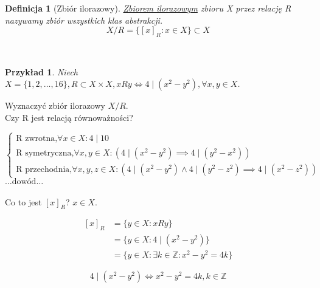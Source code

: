 \documentclass[a5paper,8pt]{article}
\theoremstyle{mythmstyle}
\newtheorem{definition}{Definicja}[section]
\newtheorem*{example}{Przykład}
\begin{document}
            \begin{definition}[Zbiór ilorazowy]
                \underline{Zbiorem ilorazowym} zbioru X przez relację R nazywamy zbiór wszystkich
                klas abstrakcji.
                \begin{equation*}
                    X / R = \{ [x]_R : x \in X \} \subset X
                \end{equation*}
            \end{definition}
            \hfill \\
            \pagebreak
            \begin{example}
                Niech $ X = \{ 1, 2, \ldots, 16 \}, R \subset X \times X, x R y 
                \iff 4 \mid (x^2 - y^2), \forall x, y \in X $.
            \end{example}
            Wyznaczyć zbiór ilorazowy $ X / R $. \\
            Czy R jest relacją równoważności?
                
            \begin{equation*}
              \begin{cases}
                \text{R zwrotna,} \forall x \in X : 4 \mid 10 \\
                \text{R symetryczna,} \forall x, y \in X : (4 \mid (x^2 - y^2) \implies 4 \mid (y^2 - x^2)) \\
                \text{R przechodnia,} \forall x, y, z \in X : (4 \mid (x^2 - y^2) \wedge 4 \mid (y^2 - z^2) \implies 4 \mid (x^2 - z^2))
              \end{cases}
            \end{equation*}
              $ \ldots \text{dowód} \ldots $\\\\
              Co to jest $ [x]_R $? $ x \in X $.

            \begin{equation*}
              \begin{aligned}
                  [x]_R &= \{ y \in X: x R y \} \\
                  &= \{ y \in X : 4 \mid (x^2 - y^2) \} \\
                  &= \{ y \in X: \exists k \in \mathbb{Z}: x^2 - y^2 = 4k \}
              \end{aligned}
            \end{equation*}

            \begin{equation*}
                4 \mid (x^2 - y^2) \iff x^2 - y^2 = 4k, k \in \mathbb{Z}
            \end{equation*}
\end{document}
